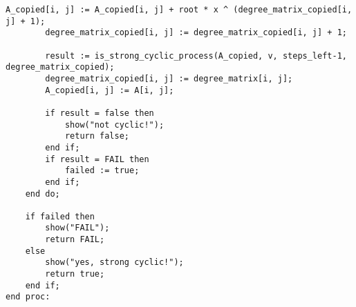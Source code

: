 \begin{lstlisting}[basicstyle=\scriptsize]
        A_copied[i, j] := A_copied[i, j] + root * x ^ (degree_matrix_copied[i, j] + 1);
        degree_matrix_copied[i, j] := degree_matrix_copied[i, j] + 1;
        
        result := is_strong_cyclic_process(A_copied, v, steps_left-1, degree_matrix_copied);
        degree_matrix_copied[i, j] := degree_matrix[i, j];
        A_copied[i, j] := A[i, j];
        
        if result = false then
            show("not cyclic!");
            return false;
        end if;
        if result = FAIL then
            failed := true;
        end if;
    end do;
    
    if failed then
        show("FAIL");
        return FAIL;
    else
        show("yes, strong cyclic!");
        return true;
    end if;
end proc:

\end{lstlisting}
